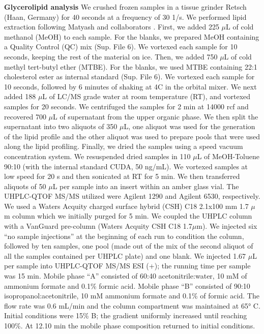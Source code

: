\documentclass[9pt,twocolumn,twoside,lineno]{BioRxiv}
\begin{document}
\textbf{Glycerolipid analysis} 
We crushed frozen samples in a tissue grinder Retsch (Haan, Germany) for 40 seconds at a frequency of 30 1/s. 
We performed lipid extraction following Matyash and collaborators \cite{Matyash2008-ue}. 
First, we added 225 $\mu$L of cold methanol (MeOH) to each sample. 
For the blanks, we prepared MeOH containing a Quality Control (QC) mix (Sup. File 6).
We vortexed each sample for 10 seconds, keeping the rest of the material on ice. 
Then, we added 750 $\mu$L of cold methyl tert-butyl ether (MTBE). 
For the blanks, we used MTBE containing 22:1 cholesterol ester as internal standard (Sup. File 6). 
We vortexed each sample for 10 seconds, followed by 6 minutes of shaking at 4\degree C in the orbital mixer. 
We next added 188 $\mu$L of LC/MS grade water at room temperature (RT), and vortexed samples for 20 seconds.
We centrifuged the samples for 2 min at 14000 rcf and recovered 700 $\mu$L of supernatant from the upper organic phase. 
We then split the supernatant into two aliquots of 350 $\mu$L, one aliquot was used for the generation of the lipid profile and the other aliquot was used to prepare pools that were used along the lipid profiling. 
Finally, we dried the samples using a speed vacuum concentration system.
We resuspended dried samples in 110 $\mu$L of MeOH-Toluene 90:10 (with the internal standard CUDA, 50 ng/mL). 
We vortexed samples at low speed for 20 s and then sonicated at RT for 5 min. 
We then transferred aliquots of 50 $\mu$L per sample into an insert within an amber glass vial.
The UHPLC-QTOF MS/MS utilized were Agilent 1290 and Agilent 6530, respectively. 
We used a Waters Acquity charged surface hybrid (CSH) C18 2.1x100 mm 1.7 $\mu$m column which we initially purged for 5 min. 
We coupled the UHPLC column with a VanGuard pre-column (Waters Acquity CSH C18 1.7$\mu$m). 
We injected six “no sample injections” at the beginning of each run to condition the column, followed by ten samples, one pool (made out of the mix of the second aliquot of all the samples contained per UHPLC plate) and one blank.
We injected 1.67 $\mu$L per sample into UHPLC-QTOF MS/MS ESI (+); the running time per sample was 15 min. 
Mobile phase “A” consisted of 60:40 acetonitrile:water, 10 mM of ammonium formate and 0.1\% formic acid. 
Mobile phase “B” consisted of 90:10 isopropanol:acetonitrile, 10 mM ammonium formate and 0.1\% of formic acid. 
The flow rate was 0.6 mL/min and the column compartment was maintained at 65° C. Initial conditions were 15\% B; the gradient uniformly increased until reaching 100\%. 
At 12.10 min the mobile phase composition returned to initial conditions.
\end{document}
